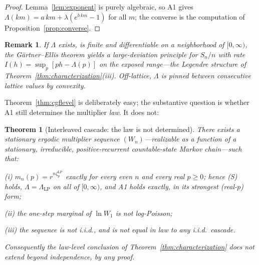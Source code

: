 \documentclass[pdflatex,sn-mathphys-num]{sn-jnl}
\theoremstyle{thmstyleone}
\newtheorem{theorem}{Theorem}
\theoremstyle{thmstyletwo}
\newtheorem*{remark}{Remark}
\theoremstyle{thmstylethree}
\begin{document}
\begin{proof}
Lemma~\ref{lem:exponent} is purely algebraic, so A1 gives
$\Lambda(km) = a\,km + \lambda(e^{b\,km}-1)$ for all $m$; the
converse is the computation of Proposition~\ref{prop:converse}.
\end{proof}

\begin{remark}
If $\Lambda$ exists, is finite and differentiable on a neighborhood
of $[0,\infty)$, the G\"artner--Ellis theorem \cite{DZ98} yields a
large-deviation principle for $S_n/n$ with rate $I(h) =
\sup_p[ph - \Lambda(p)]$ on the exposed range---the Legendre
structure of Theorem~\ref{thm:characterization}(iii).  Off-lattice,
$\Lambda$ is pinned between consecutive lattice values by convexity.
\end{remark}

Theorem~\ref{thm:cgflevel} is deliberately easy; the substantive
question is whether A1 still determines the multiplier \emph{law}.
It does not:

\begin{theorem}[Interleaved cascade: the law is not
determined]\label{thm:interleaved}
There exists a stationary ergodic multiplier sequence
$(W_n)$---realizable as a function of a stationary, irreducible,
positive-recurrent countable-state Markov chain---such that:

\textup{(i)} $m_n(p) = r^{n\zeta^{\mathrm{LP}}_p}$ \emph{exactly} for
every even $n$ and every real $p \ge 0$; hence \textup{(S)} holds,
$\Lambda = \Lambda_{\mathrm{LP}}$ on all of $[0,\infty)$, and A1
holds exactly, in its strongest (real-$p$) form;

\textup{(ii)} the one-step marginal of $\ln W_1$ is \emph{not}
log-Poisson;

\textup{(iii)} the sequence is not i.i.d., and is not equal in law
to any i.i.d.\ cascade.

Consequently the law-level conclusion of
Theorem~\ref{thm:characterization} does not extend beyond
independence, by any proof.
\end{theorem}
\end{document}
